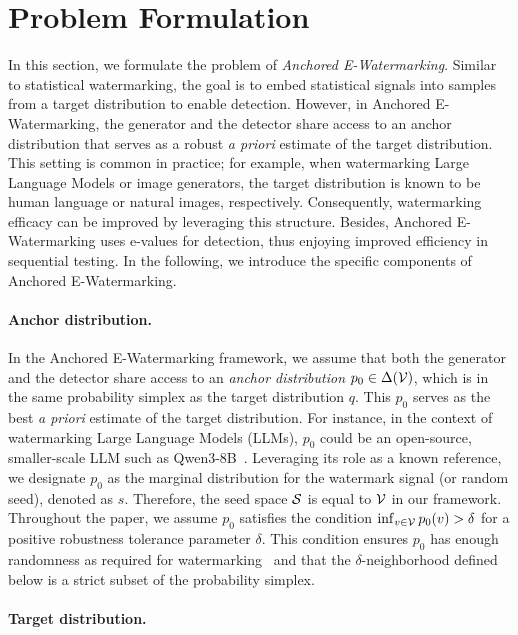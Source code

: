 \section{Problem Formulation}

In this section, we formulate the problem of \emph{Anchored E-Watermarking}. Similar to statistical watermarking, the goal is to embed statistical signals into samples from a target distribution to enable detection. However, in Anchored E-Watermarking, the generator and the detector share access to an anchor distribution that serves as a robust \emph{a priori} estimate of the target distribution. This setting is common in practice; for example, when watermarking Large Language Models or image generators, the target distribution is known to be human language or natural images, respectively. Consequently, watermarking efficacy can be improved by leveraging this structure. Besides, Anchored E-Watermarking uses e-values for detection, thus enjoying improved efficiency in sequential testing. In the following, we introduce the specific components of Anchored E-Watermarking.

\paragraph{Anchor distribution.}

In the Anchored E-Watermarking framework, we assume that both the generator and the detector share access to an \emph{anchor distribution} $p_0 \in \Delta(\mathcal{V})$, which is in the same probability simplex as the target distribution $q$. This $p_0$ serves as the best \emph{a priori} estimate of the target distribution. For instance, in the context of watermarking Large Language Models (LLMs), $p_0$ could be an open-source, smaller-scale LLM such as Qwen3-8B~\citep{qwen3technicalreport}. Leveraging its role as a known reference, we designate $p_0$ as the marginal distribution for the watermark signal (or random seed), denoted as $s$. Therefore, the seed space $\mathcal{S}$ is equal to $\mathcal{V}$ in our framework. Throughout the paper, we assume $p_0$ satisfies the condition $\inf_{v \in \mathcal{V}}p_0(v) > \delta$ for a positive robustness tolerance parameter $\delta$. This condition ensures $p_0$ has enough randomness as required for watermarking~\citep{aaronson2022my} and that the $\delta$-neighborhood defined below is a strict subset of the probability simplex.

\paragraph{Target distribution.}

